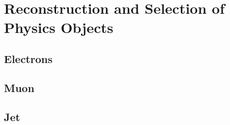 \chapter{Reconstruction and Selection of Physics Objects}

\section{Electrons}

\section{Muon}
\section{Jet}
